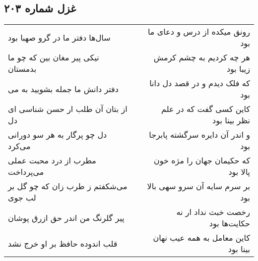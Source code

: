\begin{center}
\section*{غزل شماره ۲۰۳}
\label{sec:sh203}
\begin{longtable}{l p{0.5cm} r}
سال‌ها دفتر ما در گرو صهبا بود
&&
رونق میکده از درس و دعای ما بود
\\
نیکی پیر مغان بین که چو ما بدمستان
&&
هر چه کردیم به چشم کرمش زیبا بود
\\
دفتر دانش ما جمله بشویید به می
&&
که فلک دیدم و در قصد دل دانا بود
\\
از بتان آن طلب ار حسن شناسی ای دل
&&
کاین کسی گفت که در علم نظر بینا بود
\\
دل چو پرگار به هر سو دورانی می‌کرد
&&
و اندر آن دایره سرگشته پابرجا بود
\\
مطرب از درد محبت عملی می‌پرداخت
&&
که حکیمان جهان را مژه خون پالا بود
\\
می‌شکفتم ز طرب زان که چو گل بر لب جوی
&&
بر سرم سایه آن سرو سهی بالا بود
\\
پیر گلرنگ من اندر حق ازرق پوشان
&&
رخصت خبث نداد ار نه حکایت‌ها بود
\\
قلب اندوده حافظ بر او خرج نشد
&&
کاین معامل به همه عیب نهان بینا بود
\\
\end{longtable}
\end{center}
